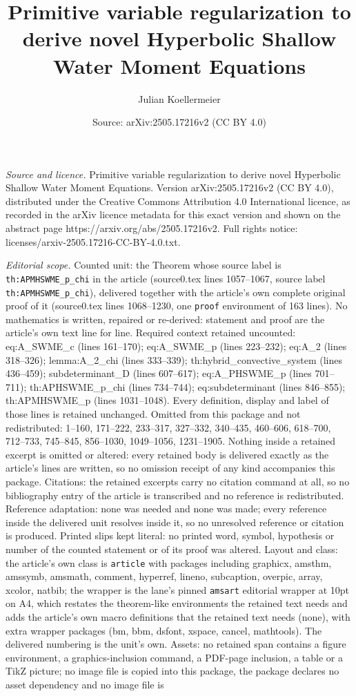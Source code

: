 \documentclass[10pt,a4paper]{amsart}
\title[Primitive variable regularization to derive novel Hyperbolic]{Primitive variable regularization to derive novel Hyperbolic Shallow Water Moment Equations}
\author{Julian Koellermeier}
\date{Source: arXiv:2505.17216v2 (CC BY 4.0)}
\begin{document}
\maketitle

\noindent\emph{Source and licence.} Primitive variable regularization to derive novel Hyperbolic Shallow Water Moment Equations. Version arXiv:2505.17216v2 (CC BY 4.0), distributed under the Creative Commons Attribution 4.0 International licence, as recorded in the arXiv licence metadata for this exact version and shown on the abstract page https://arxiv.org/abs/2505.17216v2. Full rights notice: licenses/arxiv-2505.17216-CC-BY-4.0.txt.\par\smallskip

\noindent\textit{Editorial scope.} Counted unit: the Theorem whose source label is \texttt{th:APMHSWME\_p\_chi} in the article (source0.tex lines 1057--1067, source label \texttt{th:APMHSWME\_p\_chi}), delivered together with the article's own complete original proof of it (source0.tex lines 1068--1230, one \texttt{proof} environment of 163 lines). No mathematics is written, repaired or re-derived: statement and proof are the article's own text line for line. Required context retained uncounted: eq:A\_SWME\_c (lines 161--170); eq:A\_SWME\_p (lines 223--232); eq:A\_2 (lines 318--326); lemma:A\_2\_chi (lines 333--339); th:hybrid\_convective\_system (lines 436--459); subdeterminant\_D (lines 607--617); eq:A\_PHSWME\_p (lines 701--711); th:APHSWME\_p\_chi (lines 734--744); eq:subdeterminant (lines 846--855); th:APMHSWME\_p (lines 1031--1048). Every definition, display and label of those lines is retained unchanged. Omitted from this package and not redistributed: 1--160, 171--222, 233--317, 327--332, 340--435, 460--606, 618--700, 712--733, 745--845, 856--1030, 1049--1056, 1231--1905. Nothing inside a retained excerpt is omitted or altered: every retained body is delivered exactly as the article's lines are written, so no omission receipt of any kind accompanies this package. Citations: the retained excerpts carry no citation command at all, so no bibliography entry of the article is transcribed and no reference is redistributed. Reference adaptation: none was needed and none was made; every reference inside the delivered unit resolves inside it, so no unresolved reference or citation is produced. Printed slips kept literal: no printed word, symbol, hypothesis or number of the counted statement or of its proof was altered. Layout and class: the article's own class is \texttt{article} with packages including graphicx, amsthm, amssymb, amsmath, comment, hyperref, lineno, subcaption, overpic, array, xcolor, natbib; the wrapper is the lane's pinned \texttt{amsart} editorial wrapper at 10pt on A4, which restates the theorem-like environments the retained text needs and adds the article's own macro definitions that the retained text needs (none), with extra wrapper packages (bm, bbm, dsfont, xspace, cancel, mathtools). The delivered numbering is the unit's own. Assets: no retained span contains a figure environment, a graphics-inclusion command, a PDF-page inclusion, a table or a TikZ picture; no image file is copied into this package, the package declares no asset dependency and no image file is 
\end{document}
